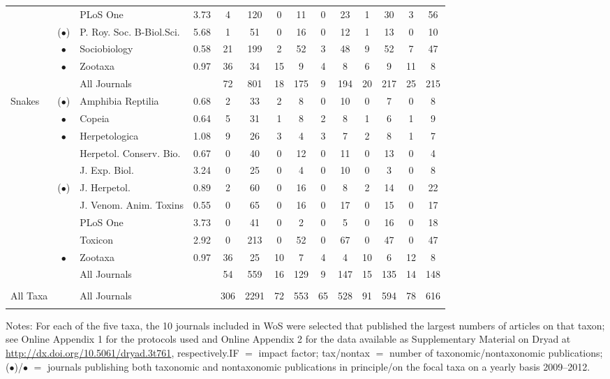 \documentclass[webpdf,PV,mynatbib,surname,CE,MSC]{SYS-PV}
\begin{document}
\begin{table*}[!p]
{\begin{tabular*}{\textwidth}{@{\extracolsep{\fill}}lclccccccccccc@{}}
~& ~& PLoS One & 3.73&  4& 120&  0& 11&  0& 23& 1& 30& 3&56 \\
~& ($\bullet$)& P. Roy. Soc. B-Biol.Sci.& 5.68& 1& 51& 0& 16& 0& 12&  1& 13& 0&10 \\
~& $\bullet$& Sociobiology & 0.58& 21& 199& 2& 52& 3& 48& 9& 52& 7&47 \\
~& $\bullet$& Zootaxa & 0.97& 36& 34& 15& 9& 4& 8&  6& 9& 11&8 \\
\textbf{~}& \textbf{~}& All Journals& ~& 72& 801& 18& 175& 9& 194&  20& 217& 25&215 \\
Snakes& ($\bullet$)& Amphibia Reptilia & 0.68& 2& 33& 2& 8& 0& 10& 0& 7& 0&8 \\
~& $\bullet$& Copeia & 0.64& 5& 31&  1& 8&  2& 8&  1& 6& 1&9 \\
~& $\bullet$& Herpetologica & 1.08&  9& 26&  3& 4&  3& 7& 2& 8& 1&7 \\
~& ~& Herpetol. Conserv. Bio.& 0.67& 0& 40& 0& 12& 0& 11& 0& 13& 0&4 \\
~& ~& J. Exp. Biol.& 3.24&  0& 25& 0& 4& 0& 10& 0& 3&  0&8 \\
~& ($\bullet$)& J. Herpetol.& 0.89& 2& 60&  0& 16&  0& 8& 2& 14& 0&22 \\
~& ~& J. Venom. Anim. Toxins& 0.55& 0& 65& 0& 16& 0& 17&  0& 15& 0&17 \\
~& ~& PLoS One & 3.73& 0& 41& 0& 2& 0& 5& 0& 16& 0&18 \\
~& ~& Toxicon & 2.92& 0& 213& 0& 52& 0& 67& 0& 47& 0&47 \\
~& $\bullet$& Zootaxa& 0.97& 36& 25& 10& 7& 4& 4& 10& 6& 12&8 \\
\textbf{~}& \textbf{~}& All Journals& ~& 54& 559& 16& 129&  9& 147&  15& 135&  14&148 \\
&&&&&&&&&&&&&\\
All Taxa& ~& All Journals&  ~& 306& 2291& 72& 553&  65& 528&  91& 594&  78&616\\ \botrule
\end{tabular*}}
{Notes: For each of the five taxa, the 10 journals included in WoS were selected that published
the largest numbers of articles on that taxon; see Online Appendix 1 for the protocols used and
Online Appendix 2 for the data available as Supplementary Material on Dryad at
\href{http://dx.doi.org/10.5061/dryad.3t761}{http://dx.doi.org/10.5061/dryad.3t761},
respectively.\newline IF $=$ impact factor; tax/nontax $=$ number of taxonomic/nontaxonomic
publications; ($\bullet$)/$\bullet$ $=$ journals publishing both taxonomic and nontaxonomic
publications in principle/on the focal taxa on a yearly basis 2009--2012.}
\end{table*}
\end{document}
